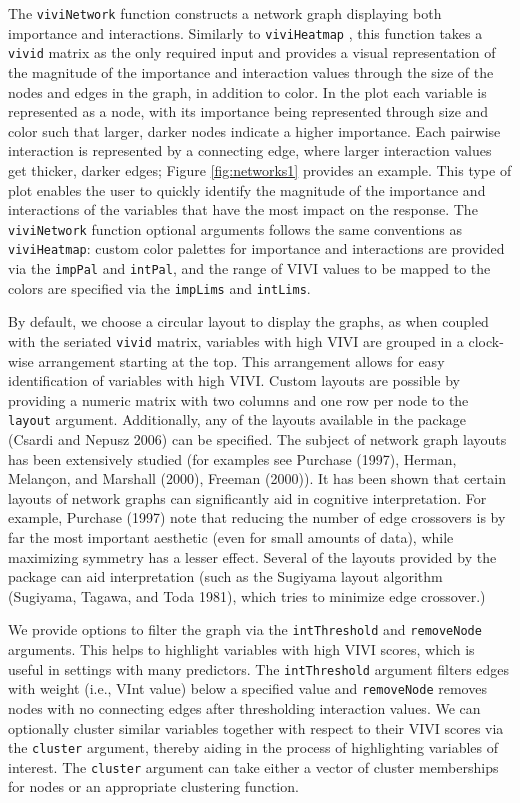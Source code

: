 The \texttt{viviNetwork} function constructs a network graph displaying both importance and interactions.
Similarly to \texttt{viviHeatmap} , this function takes a \texttt{vivid} matrix as the only required input and provides a visual representation of the magnitude of the importance and interaction values through the size of the nodes and edges in the graph, in addition to color. In the plot each variable is represented as a node, with its importance being represented through size and color such that larger, darker nodes indicate a higher importance. Each pairwise interaction is represented by a connecting edge, where larger interaction values get thicker, darker edges; Figure \ref{fig:networks1} provides an example. This type of plot enables the user to quickly identify the magnitude of the importance and interactions of the variables that have the most impact on the response. The \texttt{viviNetwork} function optional arguments follows the same conventions as \texttt{viviHeatmap}: custom color palettes for importance and interactions are provided via the \texttt{impPal} and \texttt{intPal}, and the range of VIVI values to be mapped to the colors are specified via the \texttt{impLims} and \texttt{intLims}.

By default, we choose a circular layout to display the graphs, as when coupled with the seriated \texttt{vivid} matrix, variables with high VIVI are grouped in a clock-wise arrangement starting at the top. This arrangement allows for easy identification of variables with high VIVI. Custom layouts are possible by providing a numeric matrix with two columns and one row per node to the \texttt{layout} argument. Additionally, any of the layouts available in the  package (Csardi and Nepusz 2006) can be specified. The subject of network graph layouts has been extensively studied (for examples see Purchase (1997), Herman, Melançon, and Marshall (2000), Freeman (2000)). It has been shown that certain layouts of network graphs can significantly aid in cognitive interpretation. For example, Purchase (1997) note that reducing the number of edge crossovers is by far the most important aesthetic (even for small amounts of data), while maximizing symmetry has a lesser effect. Several of the layouts provided by the  package can aid interpretation (such as the Sugiyama layout algorithm (Sugiyama, Tagawa, and Toda 1981), which tries to minimize edge crossover.)

We provide options to filter the graph via the \texttt{intThreshold} and \texttt{removeNode} arguments. This helps to highlight variables with high VIVI scores, which is useful in settings with many predictors. The \texttt{intThreshold} argument filters edges with weight (i.e., VInt value) below a specified value and \texttt{removeNode} removes nodes with no connecting edges after thresholding interaction values. We can optionally cluster similar variables together with respect to their VIVI scores via the \texttt{cluster} argument, thereby aiding in the process of highlighting variables of interest. The \texttt{cluster} argument can take either a vector of cluster memberships for nodes or an appropriate  clustering function.

